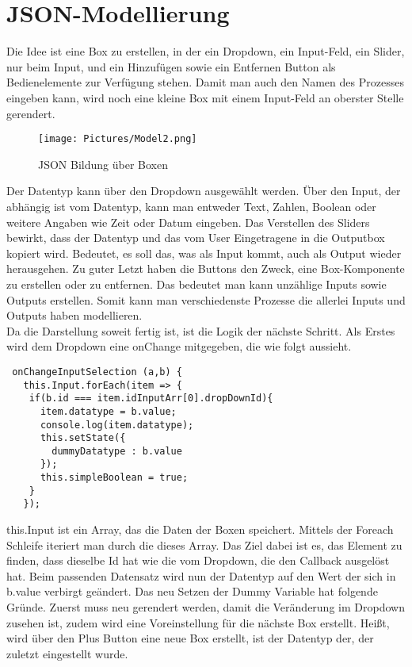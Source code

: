 \documentclass[a4paper,11pt]{scrreprt}
\begin{document}
\section{JSON-Modellierung}
Die Idee ist eine Box zu erstellen, in der ein Dropdown, ein Input-Feld, ein Slider, nur beim Input, und ein Hinzufügen sowie ein Entfernen Button als Bedienelemente zur Verfügung stehen. Damit man auch den Namen des Prozesses eingeben kann, wird noch eine kleine Box mit einem Input-Feld an oberster Stelle gerendert. 
\begin{figure}[ht]
\centering
\texttt{[image: Pictures/Model2.png]}
\caption{JSON Bildung über Boxen}
\label{JSON Bildung über Boxen}
\end{figure}
\hfill \break
Der Datentyp kann über den Dropdown ausgewählt werden. Über den Input, der abhängig ist vom Datentyp, kann man entweder Text, Zahlen, Boolean oder weitere Angaben wie Zeit oder Datum eingeben. Das Verstellen des Sliders bewirkt, dass der Datentyp und das vom User Eingetragene in die Outputbox kopiert wird. Bedeutet, es soll das, was als Input kommt, auch als Output wieder herausgehen. Zu guter Letzt haben die Buttons den Zweck,  eine Box-Komponente zu erstellen oder zu entfernen. Das bedeutet man kann unzählige Inputs sowie Outputs erstellen. Somit kann man verschiedenste Prozesse die allerlei Inputs und Outputs haben modellieren.
\\
Da die Darstellung soweit fertig ist, ist die Logik der nächste Schritt. Als Erstes wird dem Dropdown eine onChange mitgegeben, die wie folgt aussieht. 
\begin{lstlisting}
 onChangeInputSelection (a,b) {
   this.Input.forEach(item => {
    if(b.id === item.idInputArr[0].dropDownId){
      item.datatype = b.value;
      console.log(item.datatype);
      this.setState({
        dummyDatatype : b.value
      });
      this.simpleBoolean = true;
    }
   });
\end{lstlisting}
this.Input ist ein Array, das die Daten der Boxen speichert. Mittels der Foreach Schleife iteriert man durch die dieses Array. Das Ziel dabei ist es, das Element zu finden, dass dieselbe Id hat wie die vom Dropdown, die den Callback ausgelöst hat. Beim passenden Datensatz wird nun der Datentyp auf den Wert der sich in b.value verbirgt geändert. Das neu Setzen der Dummy Variable hat folgende Gründe. Zuerst muss neu gerendert werden, damit die Veränderung im Dropdown zusehen ist, zudem wird eine Voreinstellung für die nächste Box erstellt. Heißt, wird über den Plus Button eine neue Box erstellt, ist der Datentyp der, der zuletzt eingestellt wurde.
\end{document}
